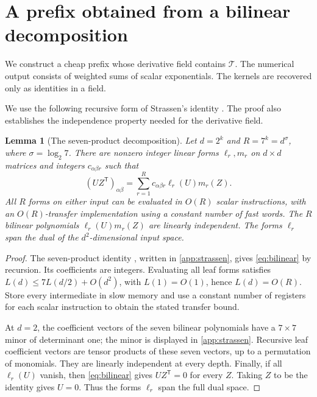 \documentclass[11pt]{article}
\newtheorem{lemma}[lemma]{Lemma}
\theoremstyle{definition}
\theoremstyle{remark}
\newcommand{\cT}{\mathcal T}
\begin{document}
\section{A prefix obtained from a bilinear decomposition}
\label{sec:bilinear}
We construct a cheap prefix whose derivative field contains $\cT$.
The numerical output consists of weighted sums of scalar exponentials.
The kernels are recovered only as identities in a field.

We use the following recursive form of Strassen's identity
\cite{strassen1969}. The proof also establishes the independence
property needed for the derivative field.

\begin{lemma}[The seven-product decomposition]
\label{lem:strassen}
Let $d=2^k$ and $R=7^k=d^\sigma$, where $\sigma=\log_2 7$.
There are nonzero integer linear forms $\ell_r,m_r$ on $d\times d$
matrices and integers $c_{\alpha\beta r}$ such that
\begin{equation}
 (UZ^{\mathsf T})_{\alpha\beta}
 =\sum_{r=1}^R c_{\alpha\beta r}\ell_r(U)m_r(Z).
 \label{eq:bilinear}
\end{equation}
All $R$ forms on either input can be evaluated in $O(R)$ scalar
instructions, with an $O(R)$-transfer implementation using a constant
number of fast words. The $R$ bilinear polynomials
$\ell_r(U)m_r(Z)$ are linearly independent. The forms
$\ell_r$ span the dual of the $d^2$-dimensional input space.
\end{lemma}
\begin{proof}
The seven-product identity \cite{strassen1969}, written in
\cref{app:strassen}, gives \cref{eq:bilinear} by recursion. Its
coefficients are integers. Evaluating all leaf forms satisfies
$L(d)\le7L(d/2)+O(d^2)$, with $L(1)=O(1)$, hence $L(d)=O(R)$.
Store every intermediate in slow memory and use a constant number of
registers for each scalar instruction to obtain the stated transfer
bound.

At $d=2$, the coefficient vectors of the seven bilinear polynomials
have a $7\times7$ minor of determinant one; the minor is displayed in
\cref{app:strassen}. Recursive leaf coefficient vectors are tensor
products of these seven vectors, up to a permutation of monomials.
They are linearly independent at every depth. Finally, if all
$\ell_r(U)$ vanish, then \cref{eq:bilinear} gives $UZ^{\mathsf T}=0$
for every $Z$. Taking $Z$ to be the identity gives $U=0$. Thus the
forms $\ell_r$ span the full dual space.
\end{proof}
\end{document}
